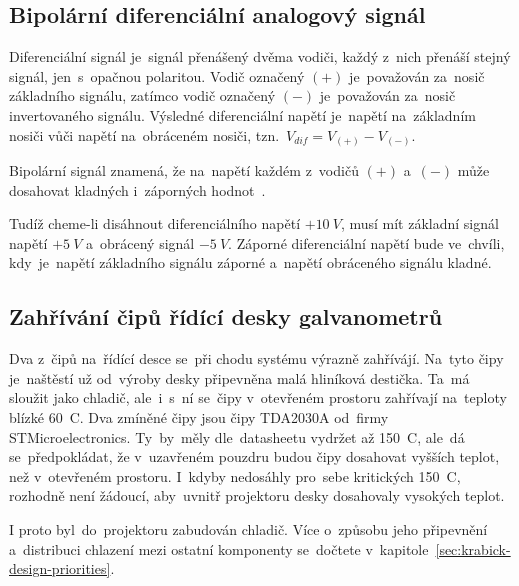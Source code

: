 \subsection{Bipolární diferenciální analogový signál}
Diferenciální signál je~signál přenášený dvěma vodiči, každý z~nich přenáší stejný signál, jen~s~opačnou polaritou. Vodič označený $(+)$ je~považován za~nosič základního signálu, zatímco vodič označený $(-)$ je~považován za~nosič invertovaného signálu. Výsledné diferenciální napětí je~napětí na~základním nosiči vůči napětí na~obráceném nosiči, tzn.~$V_{dif} = V_{(+)} - V_{(-)}$.~\cite{ilda-signal-spec}

Bipolární signál znamená, že na~napětí každém z~vodičů $(+)$ a~$(-)$ může dosahovat kladných i~záporných hodnot~\cite{ilda-signal-spec}.

Tudíž cheme-li disáhnout diferenciálního napětí $+10~V$, musí mít základní signál napětí $+5~V$ a~obrácený signál $-5~V$. Záporné diferenciální napětí bude ve~chvíli, kdy~je~napětí základního signálu záporné a~napětí obráceného signálu kladné.

\subsection{Zahřívání čipů řídící desky galvanometrů} \label{sec:galvoboard-chips-heating-up}
Dva z~čipů na~řídící desce se~při chodu systému výrazně zahřívájí. Na~tyto čipy je~naštěstí už od~výroby desky připevněna malá hliníková destička. Ta~má sloužit jako chladič, ale~i~s~ní se~čipy v~otevřeném prostoru zahřívají na~teploty blízké 60~\degree{}C.
Dva zmíněné čipy jsou čipy TDA2030A od~firmy STMicroelectronics. Ty~by~měly dle~datasheetu vydržet až 150~\degree{}C, ale~dá se~předpokládat, že v~uzavřeném pouzdru budou čipy dosahovat vyšších teplot, než v~otevřeném prostoru. I~kdyby nedosáhly pro~sebe kritických 150~\degree{}C, rozhodně není žádoucí, aby~uvnitř projektoru desky dosahovaly vysokých teplot.

I proto byl~do~projektoru zabudován chladič. Více o~způsobu jeho připevnění a~distribuci chlazení mezi ostatní komponenty se~dočtete v~kapitole~\ref{sec:krabick-design-priorities}.
